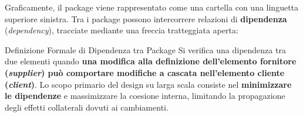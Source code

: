 \documentclass[12pt]{extarticle}
\begin{document}
\noindent Graficamente, il package viene rappresentato come una cartella con una linguetta superiore sinistra. Tra i package possono intercorrere relazioni di \textbf{dipendenza} (\textit{dependency}), tracciate mediante una freccia tratteggiata aperta:
\begin{cbox}{Definizione Formale di Dipendenza tra Package}
\noindent Si verifica una dipendenza tra due elementi quando \textbf{una modifica alla definizione dell'elemento fornitore (\textit{supplier}) può comportare modifiche a cascata nell'elemento cliente (\textit{client})}.
Lo scopo primario del design su larga scala consiste nel \textbf{minimizzare le dipendenze} e massimizzare la coesione interna, limitando la propagazione degli effetti collaterali dovuti ai cambiamenti.
\end{cbox}
\end{document}
